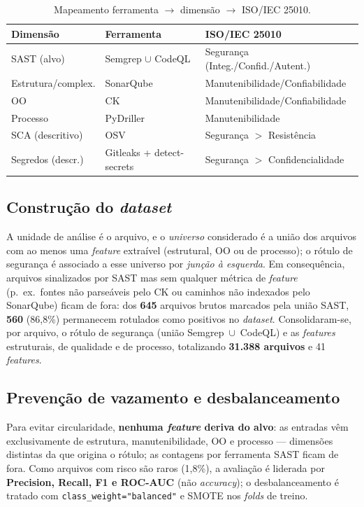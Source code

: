 \documentclass[12pt]{article}
\begin{document}
\begin{table}[ht]
\centering
\caption{Mapeamento ferramenta $\rightarrow$ dimensão $\rightarrow$ ISO/IEC 25010.}
\label{tab:stack}
\small
\begin{tabular}{@{}lll@{}}
\toprule
\textbf{Dimensão} & \textbf{Ferramenta} & \textbf{ISO/IEC 25010} \\
\midrule
SAST (alvo)        & Semgrep $\cup$ CodeQL    & Segurança (Integ./Confid./Autent.) \\
Estrutura/complex. & SonarQube               & Manutenibilidade/Confiabilidade \\
OO                 & CK                      & Manutenibilidade/Confiabilidade \\
Processo           & PyDriller               & Manutenibilidade \\
SCA (descritivo)   & OSV                     & Segurança $>$ Resistência \\
Segredos (descr.)  & Gitleaks + detect-secrets & Segurança $>$ Confidencialidade \\
\bottomrule
\end{tabular}
\end{table}

\subsection{Construção do \textit{dataset}}
A unidade de análise é o arquivo, e o \emph{universo} considerado é a união dos
arquivos com ao menos uma \textit{feature} extraível (estrutural, OO ou de
processo); o rótulo de segurança é associado a esse universo por \emph{junção à
esquerda}. Em consequência, arquivos sinalizados por SAST mas sem qualquer
métrica de \textit{feature} (p.~ex.\ fontes não parseáveis pelo CK ou caminhos
não indexados pelo SonarQube) ficam de fora: dos \textbf{645} arquivos brutos
marcados pela união SAST, \textbf{560} (86,8\%) permanecem rotulados como
positivos no \textit{dataset}. Consolidaram-se, por arquivo, o rótulo de
segurança (união Semgrep~$\cup$~CodeQL) e as \textit{features} estruturais, de
qualidade e de processo, totalizando \textbf{31.388 arquivos} e 41
\textit{features}.

\subsection{Prevenção de vazamento e desbalanceamento}
Para evitar circularidade, \textbf{nenhuma \textit{feature} deriva do alvo}: as
entradas vêm exclusivamente de estrutura, manutenibilidade, OO e processo ---
dimensões distintas da que origina o rótulo; as contagens por ferramenta SAST
ficam de fora. Como arquivos com risco são raros (1,8\%),
a avaliação é liderada por \textbf{Precision, Recall, F1 e ROC-AUC} (não
\textit{accuracy}); o desbalanceamento é tratado com
\texttt{class\_weight="balanced"} e SMOTE \cite{smote2002} nos
\textit{folds} de treino.
\end{document}
